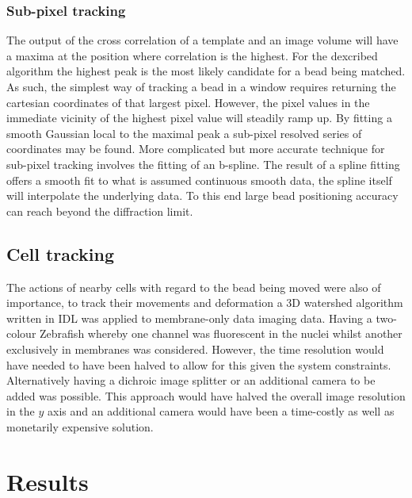 \subsubsection{Sub-pixel tracking}

The output of the cross correlation of a template and an image volume will have a maxima at the position where correlation is the highest.
For the dexcribed algorithm the highest peak is the most likely candidate for a bead being matched.
As such, the simplest way of tracking a bead in a window requires returning the cartesian coordinates of that largest pixel.
However, the pixel values in the immediate vicinity of the highest pixel value will steadily ramp up.
By fitting a smooth Gaussian local to the maximal peak a sub-pixel resolved series of coordinates may be found.
More complicated but more accurate technique for sub-pixel tracking involves the fitting of an b-spline.
The result of a spline fitting offers a smooth fit to what is assumed continuous smooth data, the spline itself will interpolate the underlying data.
To this end large bead positioning accuracy can reach beyond the diffraction limit.

\subsection{Cell tracking}

The actions of nearby cells with regard to the bead being moved were also of importance, to track their movements and deformation a 3D watershed algorithm written in IDL was applied to membrane-only data imaging data.
Having a two-colour Zebrafish whereby one channel was fluorescent in the nuclei whilst another exclusively in membranes was considered.
However, the time resolution would have needed to have been halved to allow for this given the system constraints.
Alternatively having a dichroic image splitter or an additional camera to be added was possible.
This approach would have halved the overall image resolution in the $y$ axis and an additional camera would have been a time-costly as well as monetarily expensive solution.

\section{Results}

